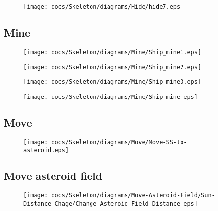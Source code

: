 \begin{figure}[H] 
    \centering 
    \texttt{[image: docs/Skeleton/diagrams/Hide/hide7.eps]} 
    \caption{} 
\end{figure} 

\subsection{Mine}

\begin{figure}[H] 
    \centering 
    \texttt{[image: docs/Skeleton/diagrams/Mine/Ship\_mine1.eps]} 
    \caption{} 
\end{figure} 

\begin{figure}[H] 
    \centering 
    \texttt{[image: docs/Skeleton/diagrams/Mine/Ship\_mine2.eps]} 
    \caption{} 
\end{figure} 

\begin{figure}[H] 
    \centering 
    \texttt{[image: docs/Skeleton/diagrams/Mine/Ship\_mine3.eps]} 
    \caption{} 
\end{figure} 

\begin{figure}[H] 
    \centering 
    \texttt{[image: docs/Skeleton/diagrams/Mine/Ship-mine.eps]} 
    \caption{} 
\end{figure} 


\subsection{Move}


\begin{figure}[H] 
    \centering 
    \texttt{[image: docs/Skeleton/diagrams/Move/Move-SS-to-asteroid.eps]} 
    \caption{} 
\end{figure} 

\subsection{Move asteroid field}

\begin{figure}[H] 
    \centering 
    \texttt{[image: docs/Skeleton/diagrams/Move-Asteroid-Field/Sun-Distance-Chage/Change-Asteroid-Field-Distance.eps]} 
    \caption{} 
\end{figure} 

